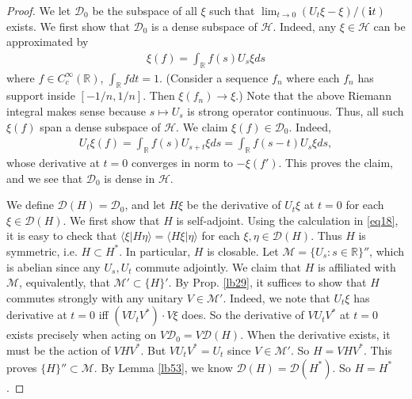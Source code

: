 \documentclass[12pt,b5paper,notitlepage]{article}
\theoremstyle{definition}
\theoremstyle{plain}
\newcommand{\mc}{\mathcal}
\newcommand{\Dom}{\scr D}
\newcommand{\bk}[1]{\langle {#1}\rangle}
\newcommand{\scr}{\mathscr}
\newcommand{\im}{\mathbf{i}}
\newcommand{\Rbb}{\mathbb R}
\numberwithin{equation}{section}
\begin{document}
\begin{proof}
We let $\Dom_0$ be the subspace of all $\xi$ such that $\lim_{t\rightarrow 0}(U_t\xi-\xi)/(\im t)$ exists. We first show that $\Dom_0$ is a dense subspace of $\mc H$. Indeed, any $\xi\in\mc H$ can be approximated by
\begin{align*}
\xi(f)=\int_\Rbb f(s)U_s\xi ds	
\end{align*}
where $f\in C_c^\infty(\Rbb)$,  $\int_\Rbb fdt=1$. (Consider a sequence $f_n$ where each $f_n$ has support inside $[-1/n,1/n]$. Then $\xi(f_n)\rightarrow\xi$.) Note that the above Riemann integral makes sense because $s\mapsto U_s$ is strong operator continuous. Thus, all such $\xi(f)$ span a dense subspace of $\mc H$. We claim $\xi(f)\in\Dom_0$. Indeed,
\begin{align*}
U_t\xi(f)=\int_\Rbb f(s)U_{s+t}\xi ds=\int_\Rbb f(s-t)U_s\xi ds,	
\end{align*}
whose derivative at $t=0$ converges in norm to $-\xi(f')$. This proves the claim, and we see that $\Dom_0$ is dense in $\mc H$.

We define $\Dom(H)=\Dom_0$, and let $H\xi$ be the derivative of $U_t\xi$ at $t=0$ for each $\xi\in\Dom(H)$. We first show that $H$ is self-adjoint. Using the calculation in \eqref{eq18}, it is easy to check that $\bk{\xi|H\eta}=\bk{H\xi|\eta}$ for each $\xi,\eta\in\Dom(H)$. Thus $H$ is symmetric, i.e. $H\subset H^*$. In particular, $H$ is closable. Let $\mc M=\{U_s:s\in\Rbb\}''$, which is abelian since any $U_s,U_t$ commute adjointly. We claim that $H$ is affiliated with $\mc M$, equivalently, that $\mc M'\subset\{H\}'$. By Prop. \ref{lb29}, it suffices to show that $H$ commutes strongly with any unitary $V\in\mc M'$. Indeed, we note that $U_t\xi$ has derivative at $t=0$ iff $(VU_tV^*)\cdot V\xi$ does. So the derivative of $VU_tV^*$ at $t=0$ exists precisely when acting on $V\Dom_0=V\Dom(H)$. When the derivative exists, it must be the action of $VHV^*$. But $VU_tV^*=U_t$ since $V\in\mc M'$. So $H=VHV^*$. This proves $\{H\}''\subset\mc M$. By Lemma \ref{lb53}, we know $\Dom(H)=\Dom(H^*)$. So $H=H^*$.


\end{proof}
\end{document}
